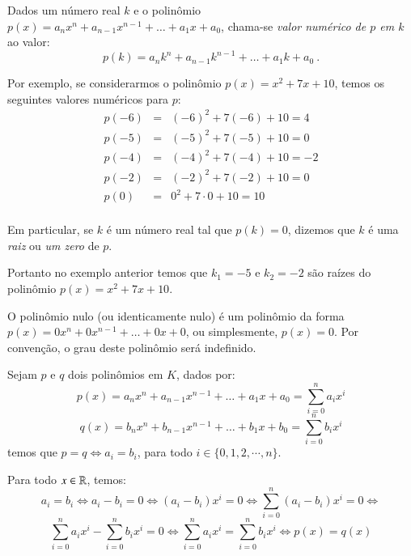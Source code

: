  \begin{defi}
 Dados um número real $k$ e o polinômio $p(x)= a_nx^n + a_{n-1}x^{n-1}+ \ldots + a_1x+ a_0$, chama-se \emph{valor numérico de $p$ em $k$} ao valor:
 \[p(k)= a_nk^n + a_{n-1}k^{n-1}+ \ldots + a_1k+ a_0 \ .\]
 \end{defi}

\begin{exem}
Por exemplo, se considerarmos o polinômio $p(x)= x^2 + 7x+10$, temos os seguintes valores numéricos para $p$:
\begin{eqnarray*}
p(-6)&=& (-6)^2 + 7(-6) +10= 4\\
p(-5)&=& (-5)^2 + 7(-5) +10= 0\\
p(-4)&=& (-4)^2 + 7(-4) +10= -2\\
p(-2)&=& (-2)^2 + 7(-2) +10= 0\\
p(0)&=& 0^2 + 7 \cdot 0 +10= 10\\
\end{eqnarray*}
\end{exem}

 \begin{defi}
 Em particular, se $k$ é um número real tal que $p(k)= 0$, dizemos que $k$ é uma \emph{raiz} ou \emph{um zero} de $p$.
 \end{defi}

 \begin{exem}
 Portanto no exemplo anterior temos que $k_1= -5$ e $k_2=-2$ são raízes do polinômio $p(x)= x^2 + 7x+10$.
 \end{exem}

  \begin{defi}
  O polinômio nulo (ou identicamente nulo) é um polinômio da forma $p(x)= 0x^n +0x^{n-1}+ \ldots + 0x+ 0$, ou simplesmente, $p(x)= 0$. Por convenção, o grau deste polinômio será indefinido.
 \end{defi}


  \begin{teo}
  Sejam $p$ e $q$ dois polinômios em $K$, dados por:
  \[p(x)= a_nx^n + a_{n-1}x^{n-1}+ \ldots + a_1x+ a_0= \sum_{i=0}^{n} a_ix^i\]
  \[q(x)= b_nx^n + b_{n-1}x^{n-1}+ \ldots + b_1x+ b_0= \sum_{i=0}^{n} b_ix^i\]
  temos que $p=q \Leftrightarrow a_i= b_i$, para todo $i \in \{0, 1, 2, \cdots, n\}$.
 \end{teo}

 \begin{dem}
 Para todo $x \in \mathbb{R}$, temos:
 \[a_i= b_i \Leftrightarrow a_i - b_i=0 \Leftrightarrow (a_i - b_i)x^i=0 \Leftrightarrow \sum_{i=0}^{n}(a_i - b_i)x^i= 0 \Leftrightarrow\]
 \[ \sum_{i=0}^{n}a_i x^i - \sum_{i=0}^{n}b_i x^i = 0 \Leftrightarrow \sum_{i=0}^{n}a_i x^i = \sum_{i=0}^{n}b_i x^i \Leftrightarrow p(x)= q(x)\]

 \end{dem}

